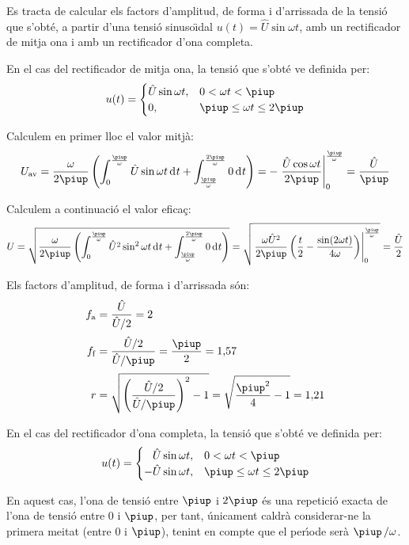 \begin{exemple}
Es tracta de calcular els factors d'amplitud, de forma i d'arrissada
de la tensi\'{o}  que s'obt\'{e}, a partir d'una tensi\'{o} sinuso\"{\i}dal
$u(t) = \hat{U} \sin\omega t$, amb un rectificador de mitja ona i
amb un rectificador d'ona completa.

En el cas del rectificador de mitja ona, la tensi\'{o} que s'obt\'{e} ve
definida per:
\[
u(t) = \begin{cases} \hat{U} \sin\omega t, & 0 < \omega t < \piup\\
       0, & \piup \leq \omega t \leq 2\piup \end{cases}
\]

Calculem en primer lloc el valor mitj\`{a}:
\[
U\ped{av} = \frac{\omega}{2\piup} \left( \int_0^\frac{\piup}{\omega}
\hat{U} \sin\omega t \diff t +
\int_\frac{\piup}{\omega}^\frac{2\piup}{\omega} 0 \diff t \right) = -
\left. \frac{\hat{U} \cos\omega t}{2\piup}
\right|_0^\frac{\piup}{\omega} = \frac{\hat{U}}{\piup}
\]

Calculem a continuaci\'{o} el valor efica\c{c}:
\[
U = \sqrt{\frac{\omega}{2\piup} \left( \int_0^\frac{\piup}{\omega}
\hat{U}^2 \sin^2\omega t \diff t +
\int_\frac{\piup}{\omega}^\frac{2\piup}{\omega} 0 \diff t \right)} =
  \sqrt{\left.\frac{\omega \hat{U}^2}{2\piup}\left( \frac{t}{2} -
\frac{\sin (2\omega t)}{4\omega}
\right)\right|_0^\frac{\piup}{\omega}} = \frac{\hat{U}}{2}
\]

Els factors d'amplitud, de forma i d'arrissada s\'{o}n:
\begin{align*}
    f\ped{a} &= \frac{\hat{U}}{\hat{U}/2} = 2 \\[0.5ex]
    f\ped{f} &= \frac{\hat{U}/2}{\hat{U}/\piup} =\frac{\piup}{2} =
    1{,}57 \\[0.5ex]
    r &= \sqrt{\left(\frac{\hat{U}/2}{\hat{U}/\piup}\right)^2-1} =
\sqrt{\frac{\piup^2}{4}-1} = 1{,}21
\end{align*}


En el cas del rectificador d'ona completa, la tensi\'{o} que s'obt\'{e} ve
definida per:
\[
u(t) = \begin{cases} \phantom{-}\hat{U} \sin\omega t, & 0 < \omega t < \piup\\
       -\hat{U} \sin\omega t, & \piup \leq \omega t \leq 2\piup \end{cases}
\]

En aquest cas, l'ona de tensi\'{o} entre $\piup$ i $2\piup$ \'{e}s una repetici\'{o}
exacta de l'ona de tensi\'{o} entre 0 i $\piup$, per tant, \'{u}nicament
caldr\`{a} considerar-ne la primera meitat (entre 0 i $\piup$), tenint en
compte que el per\'{\i}ode ser\`{a} $\piup\,/\omega$.


\end{exemple}
